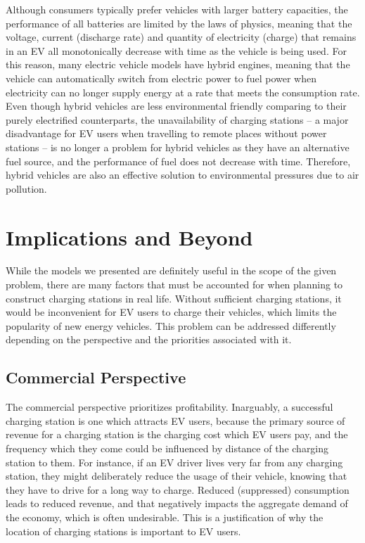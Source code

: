 \documentclass[10pt]{article}
\begin{document}
Although consumers typically prefer vehicles with larger battery capacities, the performance of all batteries are limited by the laws of physics, meaning that the voltage, current (discharge rate) and quantity of electricity (charge) that remains in an EV all monotonically decrease with time as the vehicle is being used. For this reason, many electric vehicle models have hybrid engines, meaning that the vehicle can automatically switch from electric power to fuel power when electricity can no longer supply energy at a rate that meets the consumption rate. Even though hybrid vehicles are less environmental friendly comparing to their purely electrified counterparts, the unavailability of charging stations -- a major disadvantage for EV users when travelling to remote places without power stations -- is no longer a problem for hybrid vehicles as they have an alternative fuel source, and the performance of fuel does not decrease with time. Therefore, hybrid vehicles are also an effective solution to environmental pressures due to air pollution.

\section{Implications and Beyond}

While the models we presented are definitely useful in the scope of the given problem, there are many factors that must be accounted for when planning to construct charging stations in real life. Without sufficient charging stations, it would be inconvenient for EV users to charge their vehicles, which limits the popularity of new energy vehicles. This problem can be addressed differently depending on the perspective and the priorities associated with it.

\subsection{Commercial Perspective}
The commercial perspective prioritizes profitability. Inarguably, a successful charging station is one which attracts EV users, because the primary source of revenue for a charging station is the charging cost which EV users pay, and the frequency which they come could be influenced by distance of the charging station to them. For instance, if an EV driver lives very far from any charging station, they might deliberately reduce the usage of their vehicle, knowing that they have to drive for a long way to charge. Reduced (suppressed) consumption leads to reduced revenue, and that negatively impacts the aggregate demand of the economy, which is often undesirable. This is a justification of why the location of charging stations is important to EV users.
\end{document}
